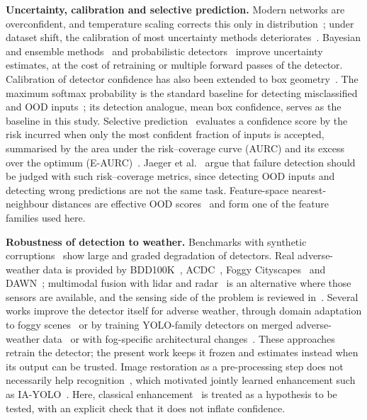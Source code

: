 \documentclass[pdflatex,sn-mathphys-num]{sn-jnl}
\begin{document}
\textbf{Uncertainty, calibration and selective prediction.} Modern networks are overconfident, and temperature scaling corrects this only in distribution~\cite{guo2017calibration}; under dataset shift, the calibration of most uncertainty methods deteriorates~\cite{ovadia2019trust}. Bayesian and ensemble methods~\cite{kendall2017uncertainties,lakshminarayanan2017ensembles} and probabilistic detectors~\cite{feng2022review} improve uncertainty estimates, at the cost of retraining or multiple forward passes of the detector. Calibration of detector confidence has also been extended to box geometry~\cite{kuppers2020multivariate}. The maximum softmax probability is the standard baseline for detecting misclassified and OOD inputs~\cite{hendrycks2017baseline}; its detection analogue, mean box confidence, serves as the baseline in this study. Selective prediction~\cite{geifman2017selective} evaluates a confidence score by the risk incurred when only the most confident fraction of inputs is accepted, summarised by the area under the risk--coverage curve (AURC) and its excess over the optimum (E-AURC)~\cite{geifman2019biasreduced}. Jaeger et al.~\cite{jaeger2023failure} argue that failure detection should be judged with such risk--coverage metrics, since detecting OOD inputs and detecting wrong predictions are not the same task. Feature-space nearest-neighbour distances are effective OOD scores~\cite{sun2022knn,yang2024oodsurvey} and form one of the feature families used here.

\textbf{Robustness of detection to weather.} Benchmarks with synthetic corruptions~\cite{hendrycks2019benchmarking,michaelis2019winter} show large and graded degradation of detectors. Real adverse-weather data is provided by BDD100K~\cite{yu2020bdd100k}, ACDC~\cite{sakaridis2021acdc}, Foggy Cityscapes~\cite{sakaridis2018foggy} and DAWN~\cite{kenk2020dawn}; multimodal fusion with lidar and radar~\cite{bijelic2020seeing} is an alternative where those sensors are available, and the sensing side of the problem is reviewed in~\cite{zhang2023adverse}. Several works improve the detector itself for adverse weather, through domain adaptation to foggy scenes~\cite{li2023foggyda} or by training YOLO-family detectors on merged adverse-weather data~\cite{kumar2023yolov8adverse} or with fog-specific architectural changes~\cite{kuang2026fogyolo}. These approaches retrain the detector; the present work keeps it frozen and estimates instead when its output can be trusted. Image restoration as a pre-processing step does not necessarily help recognition~\cite{pei2018haze}, which motivated jointly learned enhancement such as IA-YOLO~\cite{liu2022iayolo}. Here, classical enhancement~\cite{he2011darkchannel,zuiderveld1994clahe} is treated as a hypothesis to be tested, with an explicit check that it does not inflate confidence.
\end{document}
